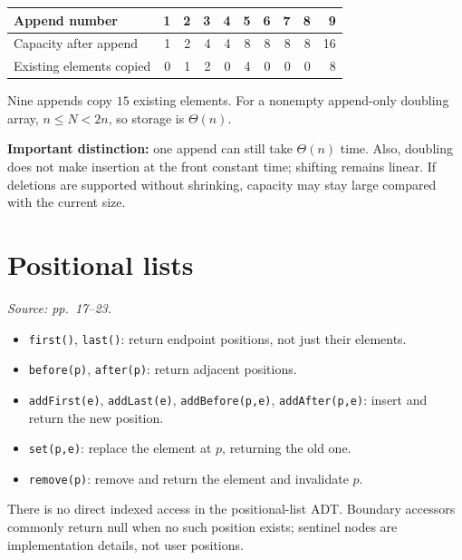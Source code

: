 \documentclass[11pt]{article}
\begin{document}
\begin{center}
\small
\begin{tabular}{lrrrrrrrrr}
\toprule
Append number &1&2&3&4&5&6&7&8&9\\
\midrule
Capacity after append &1&2&4&4&8&8&8&8&16\\
Existing elements copied &0&1&2&0&4&0&0&0&8\\
\bottomrule
\end{tabular}
\end{center}
Nine appends copy $15$ existing elements. For a nonempty append-only doubling array, $n\le N<2n$, so storage is $\Theta(n)$.

\textbf{Important distinction:} one append can still take $\Theta(n)$ time. Also, doubling does not make insertion at the front constant time; shifting remains linear. If deletions are supported without shrinking, capacity may stay large compared with the current size.

\section{Positional lists}
\textit{Source: pp.\ 17--23.}
\begin{itemize}
\item \texttt{first()}, \texttt{last()}: return endpoint positions, not just their elements.
\item \texttt{before(p)}, \texttt{after(p)}: return adjacent positions.
\item \texttt{addFirst(e)}, \texttt{addLast(e)}, \texttt{addBefore(p,e)}, \texttt{addAfter(p,e)}: insert and return the new position.
\item \texttt{set(p,e)}: replace the element at $p$, returning the old one.
\item \texttt{remove(p)}: remove and return the element and invalidate $p$.
\end{itemize}
There is no direct indexed access in the positional-list ADT. Boundary accessors commonly return null when no such position exists; sentinel nodes are implementation details, not user positions.
\end{document}
